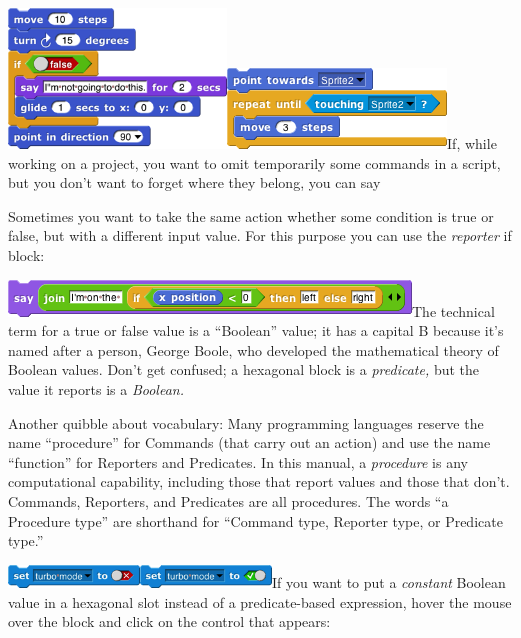 \includegraphics[width=2.28194in,height=1.46875in]{media/image88.png}\includegraphics[width=2.29167in,height=0.84375in]{media/image89.png}If,
while working on a project, you want to omit temporarily some commands
in a script, but you don't want to forget where they belong, you can say

Sometimes you want to take the same action whether some condition is
true or false, but with a different input value. For this purpose you
can use the \emph{reporter} if block:

\includegraphics[width=4.20833in,height=0.38542in]{media/image90.png}The
technical term for a true or false value is a ``Boolean'' value; it has
a capital B because it's named after a person, George Boole, who
developed the mathematical theory of Boolean values. Don't get confused;
a hexagonal block is a \emph{predicate,} but the value it reports is a
\emph{Boolean.}

Another quibble about vocabulary: Many programming languages reserve the
name ``procedure'' for Commands (that carry out an action) and use the
name ``function'' for Reporters and Predicates. In this manual, a
\emph{procedure} is any computational capability, including those that
report values and those that don't. Commands, Reporters, and Predicates
are all procedures. The words ``a Procedure type'' are shorthand for
``Command type, Reporter type, or Predicate type.''

\includegraphics[width=1.375in,height=0.24306in]{media/image91.png}\includegraphics[width=1.375in,height=0.24306in]{media/image92.png}If
you want to put a \emph{constant} Boolean value in a hexagonal slot
instead of a predicate-based expression, hover the mouse over the block
and click on the control that appears:

